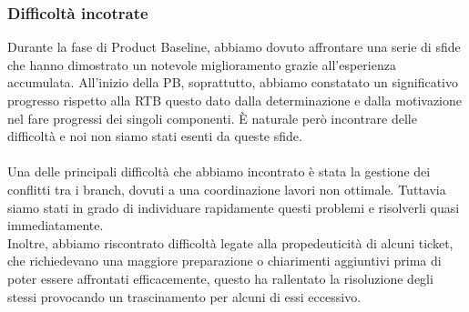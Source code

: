 \documentclass[5pt]{article}
\begin{document}
    \subsubsection{Difficoltà incotrate}
    Durante la fase di Product Baseline, abbiamo dovuto affrontare una serie di sfide che hanno dimostrato un notevole miglioramento grazie all'esperienza accumulata. All'inizio della PB, soprattutto, abbiamo constatato un significativo progresso rispetto alla RTB questo dato dalla determinazione e dalla motivazione nel fare progressi dei singoli componenti.
    È naturale però incontrare delle difficoltà e noi non siamo stati esenti da queste sfide.\\\\
    Una delle principali difficoltà che abbiamo incontrato è stata la gestione dei conflitti tra i branch, dovuti a una coordinazione lavori non ottimale. Tuttavia siamo stati in grado di individuare rapidamente questi problemi e risolverli quasi immediatamente.\\
    Inoltre, abbiamo riscontrato difficoltà legate alla propedeuticità di alcuni ticket, che richiedevano una maggiore preparazione o chiarimenti aggiuntivi prima di poter essere affrontati efficacemente, questo ha rallentato la risoluzione degli stessi provocando un trascinamento per alcuni di essi eccessivo.
    
\end{document}
